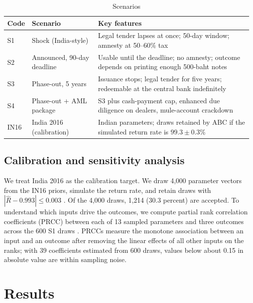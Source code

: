 \documentclass[11pt]{article}
\theoremstyle{definition}
\theoremstyle{remark}
\begin{document}
\begin{table}[!htbp]\centering\footnotesize
\caption{Scenarios}\label{tab:scenarios}
\begin{tabularx}{\textwidth}{@{}p{1.1cm}p{4cm}Y@{}}
\toprule
Code & Scenario & Key features\\
\midrule
S1 & Shock (India-style) & Legal tender lapses at once; 50-day window; amnesty at 50--60\% tax\\
S2 & Announced, 90-day deadline & Usable until the deadline; no amnesty; outcome depends on printing enough 500-baht notes\\
S3 & Phase-out, 5 years & Issuance stops; legal tender for five years; redeemable at the central bank indefinitely\\
S4 & Phase-out + AML package & S3 plus cash-payment cap, enhanced due diligence on dealers, mule-account crackdown\\
IN16 & India 2016 (calibration) & Indian parameters; draws retained by ABC if the simulated return rate is $99.3\pm0.3\%$\\
\bottomrule
\end{tabularx}
\end{table}

\subsection{Calibration and sensitivity analysis}
We treat India 2016 as the calibration target. We draw 4,000 parameter vectors from the IN16 priors, simulate the return
rate, and retain draws with $|\hat R-0.993|\le0.003$ \citep{beaumont2002}. Of the 4,000 draws, 1,214 (30.3 percent) are
accepted. To understand which inputs drive the outcomes, we compute partial rank correlation coefficients (PRCC) between
each of 13 sampled parameters and three outcomes across the 600 S1 draws \citep{marino2008}. PRCCs measure the monotone
association between an input and an outcome after removing the linear effects of all other inputs on the ranks; with 39
coefficients estimated from 600 draws, values below about 0.15 in absolute value are within sampling noise.

\section{Results}\label{sec:results}
\end{document}
